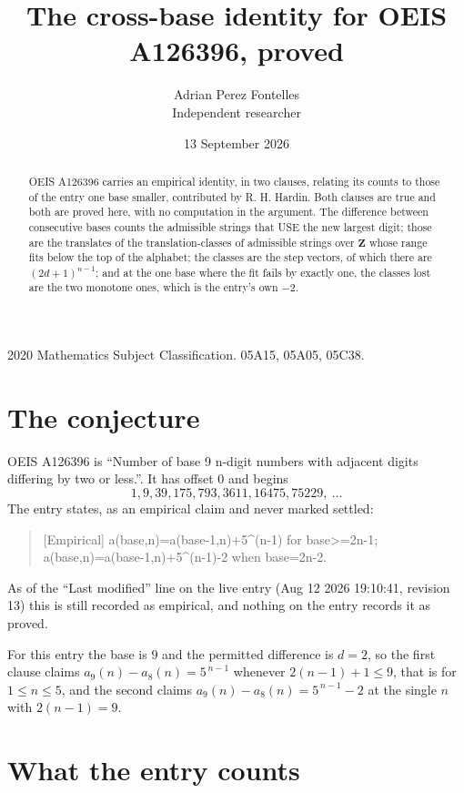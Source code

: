 \documentclass[11pt,a4paper]{article}
\title{The cross-base identity for OEIS A126396, proved}
\author{Adrian Perez Fontelles\\ \small Independent researcher}
\date{13 September 2026}
\theoremstyle{plain}
\theoremstyle{definition}
\begin{document}
\maketitle

\begin{abstract}
OEIS A126396 carries an empirical identity, in two clauses, relating its counts to those of the
entry one base smaller, contributed by R. H. Hardin. Both clauses are true and both are proved
here, with no computation in the argument. The difference between consecutive bases counts the
admissible strings that USE the new largest digit; those are the translates of the
translation-classes of admissible strings over $\mathbf{Z}$ whose range fits below the top of
the alphabet; the classes are the step vectors, of which there are $(2d+1)^{n-1}$; and at the
one base where the fit fails by exactly one, the classes lost are the two monotone ones, which
is the entry's own $-2$.
\end{abstract}

\noindent\small 2020 Mathematics Subject Classification. 05A15, 05A05, 05C38.\normalsize

\section{The conjecture}

OEIS A126396 is ``Number of base 9 n-digit numbers with adjacent digits differing by two or less.''. It has offset $0$ and begins
\[
1, 9, 39, 175, 793, 3611, 16475, 75229,\ \dots
\]
The entry states, as an empirical claim and never marked settled:
\begin{quote}
[Empirical] a(base,n)=a(base-1,n)+5\textasciicircum{}(n-1) for base>=2n-1; a(base,n)=a(base-1,n)+5\textasciicircum{}(n-1)-2 when base=2n-2.
\end{quote}
As of the ``Last modified'' line on the live entry (Aug 12 2026 19:10:41, revision 13)
this is still recorded as empirical, and nothing on the entry records it as proved.

For this entry the base is $9$ and the permitted difference is $d=2$, so the first clause
claims $a_{9}(n)-a_{8}(n)=5^{\,n-1}$ whenever $2(n-1)+1\le9$, that is for
$1\le n\le5$, and the second claims $a_{9}(n)-a_{8}(n)=5^{\,n-1}-2$ at the single
$n$ with $2(n-1)=9$.

\section{What the entry counts}
\end{document}
